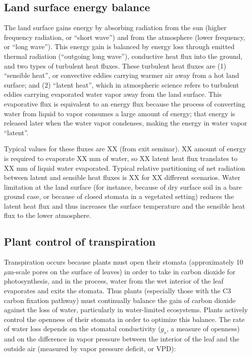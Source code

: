 \subsection{Land surface energy balance}

The land surface gains energy by absorbing radiation from the sun (higher frequency radiation, or ``short wave'') and from the atmosphere (lower frequency, or ``long wave'').  This energy gain is balanced by energy loss through emitted thermal radiation (``outgoing long wave''), conductive heat flux into the ground, and two types of turbulent heat fluxes.  These turbulent heat fluxes are (1) ``sensible heat'', or convective eddies carrying warmer air away from a hot land surface; and (2) ``latent heat'', which in atmospheric science refers to turbulent eddies carrying evaporated water vapor away from the land surface.  This evaporative flux is equivalent to an energy flux because the process of converting water from liquid to vapor consumes a large amount of energy; that energy is released later when the water vapor condenses, making the energy in water vapor ``latent''.

Typical values for these fluxes are XX (from exit seminar).  XX amount of energy is required to evaporate XX mm of water, so XX latent heat flux translates to XX mm of liquid water evaporated.  Typical relative partitioning of net radiation between latent and sensible heat fluxes is XX for XX different scenarios.  Water limitation at the land surface (for instance, because of dry surface soil in a bare ground case, or because of closed stomata in a vegetated setting) reduces the latent heat flux and thus increases the surface temperature and the sensible heat flux to the lower atmosphere.

\subsection{Plant control of transpiration}

Transpiration occurs because plants must open their stomata (approximately 10 $\mu$m-scale pores on the surface of leaves) in order to take in carbon dioxide for photosynthesis, and in the process, water from the wet interior of the leaf evaporates and exits the stomata.  Thus plants (especially those with the C3 carbon fixation pathway) must continually balance the gain of carbon dioxide against the loss of water, particularly in water-limited ecosystems.  Plants actively control the openness of their stomata in order to optimize this balance.  The rate of water loss depends on the stomatal conductivity ($g_s$, a measure of openness) and on the difference in vapor pressure between the interior of the leaf and the outside air (measured by vapor pressure deficit, or VPD):

